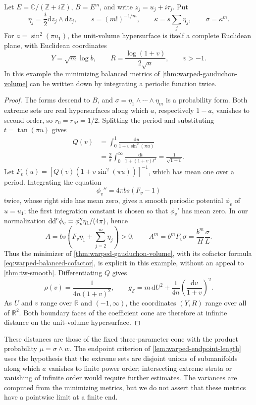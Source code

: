 \begin{example}\label{ex:warped-torus-plane}
Let $E=\mathbb C/(\mathbb Z+i\mathbb Z)$, $B=E^m$, and write $z_j=u_j+i\tau_j$. Put
\[
 \eta_j=\frac i2\mathrm{d}z_j\wedge\mathrm{d}\bar z_j,
 \qquad s=(m!)^{-1/m},\qquad
 \kappa=s\sum_j\eta_j,\qquad\sigma=\kappa^m.
\]
For $a=\sin^2(\pi u_1)$, the unit-volume hypersurface is itself a complete Euclidean plane, with Euclidean coordinates
\[
 Y=\sqrt m\log b,\qquad
 R=\frac{\log(1+v)}{2\sqrt n},\qquad v>-1.
\]
In this example the minimizing balanced metrics of \cref{thm:warped-gauduchon-volume} can be written down by integrating a periodic function twice.
\end{example}
\begin{proof}
The forms descend to $B$, and $\sigma=\eta_1\wedge\cdots\wedge\eta_m$ is a probability form. Both extreme sets are real hypersurfaces along which $a$, respectively $1-a$, vanishes to second order, so $r_0=r_M=1/2$. Splitting the period and substituting $t=\tan(\pi u)$ gives
\begin{align*}
 Q(v)&=\int_0^1\frac{\mathrm{d}u}{1+v\sin^2(\pi u)}\\
     &=\frac2\pi\int_0^\infty\frac{\mathrm{d}t}{1+(1+v)t^2}
      =\frac1{\sqrt{1+v}}.
\end{align*}
Let $F_v(u)=[Q(v)(1+v\sin^2(\pi u))]^{-1}$, which has mean one over a period. Integrating the equation
\[
 \phi_v''=4\pi bs(F_v-1)
\]
twice, whose right side has mean zero, gives a smooth periodic potential $\phi_v$ of $u=u_1$; the first integration constant is chosen so that $\phi_v'$ has mean zero. In our normalization $\mathrm{dd}^{\mathrm{c}}\phi_v=\phi_v''\eta_1/(4\pi)$, hence
\[
 A=bs\left(F_v\eta_1+\sum_{j=2}^m\eta_j\right)>0,
 \qquad A^m=b^mF_v\sigma=\frac{b^m}{H}\frac{\sigma}{L}.
\]
Thus the minimizer of \cref{thm:warped-gauduchon-volume}, with its cofactor formula \eqref{eq:warped-balanced-cofactor}, is explicit in this example, without an appeal to \cref{thm:tw-smooth}. Differentiating $Q$ gives
\[
 \rho(v)=\frac1{4n(1+v)^2},\qquad
 g_{\mathscr S}=m\,\mathrm{d}U^2+
             \frac1{4n}\left(\frac{\mathrm{d}v}{1+v}\right)^2.
\]
As $U$ and $v$ range over $\mathbb R$ and $(-1,\infty)$, the coordinates $(Y,R)$ range over all of $\mathbb R^2$. Both boundary faces of the coefficient cone are therefore at infinite distance on the unit-volume hypersurface.
\end{proof}

These distances are those of the fixed three-parameter cone with the product probability $\mu=\sigma\wedge w$. The endpoint criterion of \cref{lem:warped-endpoint-length} uses the hypothesis that the extreme sets are disjoint unions of submanifolds along which $a$ vanishes to finite power order; intersecting extreme strata or vanishing of infinite order would require further estimates. The variances are computed from the minimizing metrics, but we do not assert that these metrics have a pointwise limit at a finite end.
